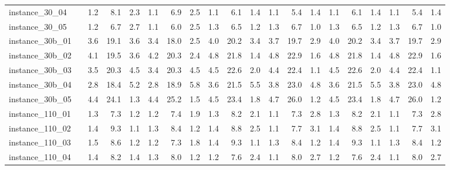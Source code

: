 \documentclass[12pt,a4paper,openright,twoside]{book}
\begin{document}
\begin{table}[H]
{\begin{tabular}{|ll|rrrrrr|rrrrrr|rrrrrr|}
instance\_30\_04              &     &     1.2  &   8.1  &  2.3  &   1.1  &   6.9  &  2.5  &     1.1  &   6.1  &  1.4  &   1.1  &   5.4  &  1.4   &   1.1  &   6.1  &  1.4  &   1.1  &   5.4  &  1.4  \\  
instance\_30\_05              &     &    1.2  &   6.7  &  2.7  &   1.1  &   6.0  &  2.5  &      1.3  &   6.5  &  1.2  &   1.3  &   6.7  &  1.0   &   1.3  &   6.5  &  1.2  &   1.3  &   6.7  &  1.0  \\ 
instance\_30b\_01              &     &     3.6  &   19.1  &  3.6  &   3.4  &   18.0  &  2.5  &   4.0  &   20.2  &  3.4  &   3.7  &   19.7  &  2.9  &   4.0  &   20.2  &  3.4  &   3.7  &   19.7  &  2.9  \\       
instance\_30b\_02              &     &     4.1  &   19.5  &  3.6  &   4.2  &   20.3  &  2.4  &   4.8  &   21.8  &  1.4  &   4.8  &   22.9  &  1.6  &   4.8  &   21.8  &  1.4  &   4.8  &   22.9  &  1.6  \\       
instance\_30b\_03              &     &     3.5  &   20.3  &  4.5  &   3.4  &   20.3  &  4.5  &   4.5  &   22.6  &  2.0  &   4.4  &   22.4  &  1.1  &   4.5  &   22.6  &  2.0  &   4.4  &   22.4  &  1.1  \\       
instance\_30b\_04              &     &     2.8  &   18.4  &  5.2  &   2.8  &   18.9  &  5.8  &   3.6  &   21.5  &  5.5  &   3.8  &   23.0  &  4.8  &   3.6  &   21.5  &  5.5  &   3.8  &   23.0  &  4.8  \\       
instance\_30b\_05              &     &     4.4  &   24.1  &  1.3  &   4.4  &   25.2  &  1.5  &   4.5  &   23.4  &  1.8  &   4.7  &   26.0  &  1.2  &   4.5  &   23.4  &  1.8  &   4.7  &   26.0  &  1.2  \\       
instance\_110\_01             &     &      1.3  &   7.3  &  1.2  &   1.2  &   7.4  &  1.9  &    1.3  &   8.2  &  2.1  &   1.1  &   7.3  &  2.8  &    1.3  &   8.2  &  2.1  &   1.1  &   7.3  &  2.8   \\         
instance\_110\_02             &     &     1.4  &   9.3  &  1.1  &   1.3  &   8.4  &  1.2  &     1.4  &   8.8  &  2.5  &   1.1  &   7.7  &  3.1  &    1.4  &   8.8  &  2.5  &   1.1  &   7.7  &  3.1   \\        
instance\_110\_03             &     &     1.5  &   8.6  &  1.2  &   1.2  &   7.3  &  1.8  &     1.4  &   9.3  &  1.1  &   1.3  &   8.4  &  1.2  &    1.4  &   9.3  &  1.1  &   1.3  &   8.4  &  1.2   \\        
instance\_110\_04             &     &      1.4  &   8.2  &  1.4  &   1.3  &   8.0  &  1.2  &    1.2  &   7.6  &  2.4  &   1.1  &   8.0  &  2.7  &    1.2  &   7.6  &  2.4  &   1.1  &   8.0  &  2.7   \\          

\end{tabular}}
\end{table}
\end{document}
